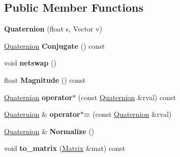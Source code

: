 \subsection*{Public Member Functions}
\begin{DoxyCompactItemize}
\item 
{\bfseries Quaternion} (float s, Vector v)\hypertarget{structQuaternion_a1e1a0acfb7da7e28532808455d25b0f5}{}\label{structQuaternion_a1e1a0acfb7da7e28532808455d25b0f5}

\item 
\hyperlink{structQuaternion}{Quaternion} {\bfseries Conjugate} () const \hypertarget{structQuaternion_a0ee64800ff331f0a7d2572c86f98b83b}{}\label{structQuaternion_a0ee64800ff331f0a7d2572c86f98b83b}

\item 
void {\bfseries netswap} ()\hypertarget{structQuaternion_ab238e9312256e390269518cb19bb022b}{}\label{structQuaternion_ab238e9312256e390269518cb19bb022b}

\item 
float {\bfseries Magnitude} () const \hypertarget{structQuaternion_a591cb51388ad1322110d6783ee677781}{}\label{structQuaternion_a591cb51388ad1322110d6783ee677781}

\item 
\hyperlink{structQuaternion}{Quaternion} {\bfseries operator$\ast$} (const \hyperlink{structQuaternion}{Quaternion} \&rval) const \hypertarget{structQuaternion_af41a5efb5f0ed41c04f3ce28a775c26d}{}\label{structQuaternion_af41a5efb5f0ed41c04f3ce28a775c26d}

\item 
\hyperlink{structQuaternion}{Quaternion} \& {\bfseries operator$\ast$=} (const \hyperlink{structQuaternion}{Quaternion} \&rval)\hypertarget{structQuaternion_a52963ed93e321e8f58eea0c3c6f0b863}{}\label{structQuaternion_a52963ed93e321e8f58eea0c3c6f0b863}

\item 
\hyperlink{structQuaternion}{Quaternion} \& {\bfseries Normalize} ()\hypertarget{structQuaternion_a893efdfae58f3667a4b82318f034af9e}{}\label{structQuaternion_a893efdfae58f3667a4b82318f034af9e}

\item 
void {\bfseries to\+\_\+matrix} (\hyperlink{classMatrix}{Matrix} \&mat) const \hypertarget{structQuaternion_a574050df51f8756478b7b672acc7fe66}{}\label{structQuaternion_a574050df51f8756478b7b672acc7fe66}

\end{DoxyCompactItemize}
